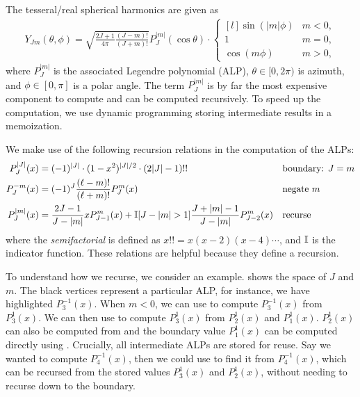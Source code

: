 The tesseral/real spherical harmonics are given as
\begin{align}
    Y_{Jm}(\theta, \phi) = \sqrt{\frac{2 J + 1}{4 \pi}\frac{(J-m)!}{(J+m)!}} P_J^{|m|}(\cos \theta) \cdot \left \{ \begin{matrix*}[l]
     \sin(|m| \phi)  & m < 0,\\
    1 & m = 0, \\
    \cos(m \phi) & m > 0,
    \end{matrix*} \right .
\end{align}
where $P_J^{|m|}$ is the associated Legendre polynomial (ALP), $\theta \in [0, 2\pi)$ is azimuth, and $\phi \in [0,\pi]$ is a polar angle. The term $P_J^{|m|}$ is by far the most expensive component to compute and can be computed recursively. To speed up the computation, we use dynamic programming storing intermediate results in a memoization. 

We make use of the following recursion relations in the computation of the ALPs:
\begin{align}
    P_J^{|J|}(x) &= (-1)^{|J|} \cdot (1-x^2)^{|J|/2} \cdot (2|J|-1)!! && \text{boundary: $J=m$} \label{eq:leg-boundary} \\
    P_J^{-m}(x) &= (-1)^J \frac{(\ell - m)!}{(\ell + m)!} P_J^{m}(x) && \text{negate $m$} \label{eq:leg-negate}\\
    P_J^{|m|}(x) &= \frac{2J-1}{J-|m|} x P_{J-1}^{m}(x) + \mathbb{I}[J - |m| > 1] \frac{J + |m| - 1}{J - |m|} P_{J-2}^{m}(x) && \text{recurse} \label{eq:leg-recurse}
\end{align}
where the \emph{semifactorial} is defined as $x!! = x (x-2) (x-4) \cdots$, and $\mathbb{I}$ is the indicator function. These relations are helpful because they define a recursion. 

To understand how we recurse, we consider an example.  shows the space of $J$ and $m$. The black vertices represent a particular ALP, for instance, we have highlighted $P_3^{-1}(x)$. When $m <0$, we can use  to compute $P_3^{-1}(x)$ from $P_3^1(x)$. We can then use 
 to compute $P_3^1(x)$ from $P_2^1(x)$ and $P_1^1(x)$. $P_2^1(x)$ can also be computed from  and the boundary value $P_1^1(x)$ can be computed directly using . Crucially, all intermediate ALPs are stored for reuse. Say we wanted to compute $P_4^{-1}(x)$, then we could use  to find it from $P_4^{-1}(x)$, which can be recursed from the stored values $P_3^1(x)$ and $P_2^1(x)$, without needing to recurse down to the boundary.

